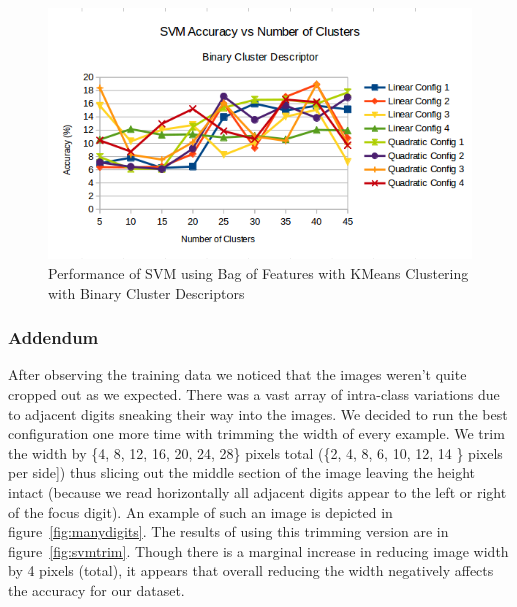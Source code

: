 \documentclass{article} %
\begin{document}
\begin{figure}
\centering
	\includegraphics[width=0.9\linewidth]{./plots/svm/clusterbinary}
    	\caption{Performance of SVM using Bag of Features with KMeans Clustering with Binary Cluster Descriptors}
	\label{fig:clusterbinary}
\end{figure}

\subsubsection{Addendum}
After observing the training data we noticed that the images weren't quite cropped out as we expected.  There was a vast array of intra-class variations due to adjacent digits sneaking their way into the images.  We decided to run the best configuration one more time with trimming the width of every example.  We trim the width by \{4, 8, 12, 16, 20, 24, 28\} pixels total (\{2, 4, 8, 6, 10, 12, 14 \} pixels per side]) thus slicing out the middle section of the image leaving the height intact (because we read horizontally all adjacent digits appear to the left or right of the focus digit).  An example of such an image is depicted in figure~\ref{fig:manydigits}.  The results of using this trimming version are in figure~\ref{fig:svmtrim}. Though there is a marginal increase in reducing image width by 4 pixels (total), it appears that overall reducing the width negatively affects the accuracy for our dataset.
\end{document}
